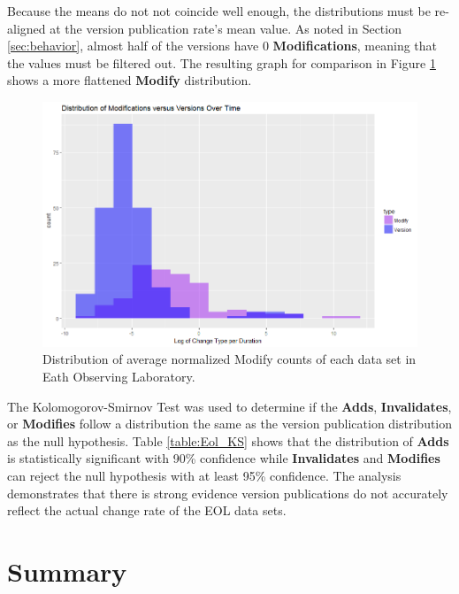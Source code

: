 Because the means do not not coincide well enough, the distributions must be re-aligned at the version publication rate's mean value.
As noted in Section \ref{sec:behavior}, almost half of the versions have 0 \textbf{Modifications}, meaning that the values must be filtered out.
The resulting graph for comparison in Figure \ref{EOL_Mod_Ver} shows a more flattened \textbf{Modify} distribution.
\begin{figure}%
	\centering
	\includegraphics[scale=.6]{figures/Eol_Mod_Ver_Rate.png}
	\caption{Distribution of average normalized Modify counts of each data set in Eath Observing Laboratory.}
	\label{EOL_Mod_Ver}
\end{figure}

The Kolomogorov-Smirnov Test was used to determine if the \textbf{Adds}, \textbf{Invalidates}, or \textbf{Modifies} follow a distribution the same as the version publication distribution as the null hypothesis.  
Table \ref{table:Eol_KS} shows that the distribution of \textbf{Adds} is statistically significant with 90\% confidence while \textbf{Invalidates} and \textbf{Modifies} can reject the null hypothesis with at least 95\% confidence.
The analysis demonstrates that there is strong evidence version publications do not accurately reflect the actual change rate of the EOL data sets.

\section{Summary}

